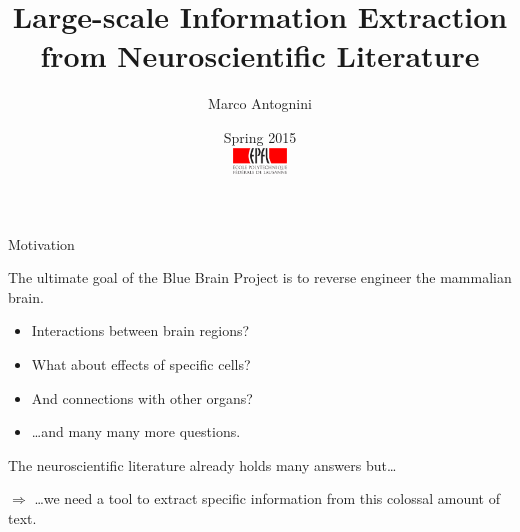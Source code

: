 \documentclass[10pt, compress, xcolor={usenames,dvipsnames}]{beamer}
\title{Large-scale Information Extraction from Neuroscientific Literature}
\author{Marco Antognini}
\date{%
  \small Spring 2015\\[2em]
  \includegraphics[height=7mm]{img/epfl-logo}}
\renewcommand{\emph}[1]{\alert{#1}}
\begin{document}
\begin{frame}
  \titlepage
\end{frame}



\begin{frame}[fragile]{Motivation}
  \begin{myquote}
    The ultimate goal of the \emph{Blue Brain Project} is to reverse engineer
    the mammalian brain.
  \end{myquote}

  \pause

  \begin{itemize}[label=]

    \item Interactions between brain regions?

    \item What about effects of specific cells?

    \item And connections with other organs?

    \item \ldots and many many more questions.

  \end{itemize}


  The neuroscientific \emph{literature} already holds many answers but\ldots

  \pause

  $\Longrightarrow$ \ldots we need a tool to \emph{extract specific information}
  from this colossal amount of text.

\end{frame}
\end{document}
